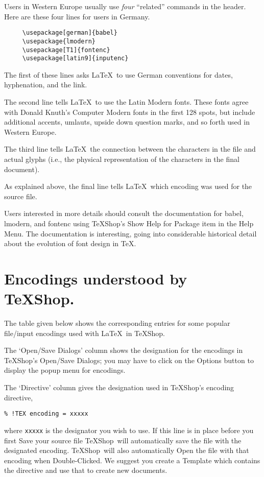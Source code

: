 \documentclass[letterpaper,11pt]{article}
\newcommand{\TS}{\textsf{\TeX Shop}}
\newcommand{\cmd}[1]{\textsf{#1}}
\begin{document}
Users in Western Europe usually use \emph{four} ``related'' commands in the header.
Here are these four lines for users in Germany.
\begin{verbatim}
     \usepackage[german]{babel}
     \usepackage{lmodern}
     \usepackage[T1]{fontenc}
     \usepackage[latin9]{inputenc}
\end{verbatim}

The first of these lines asks \LaTeX\ to use German conventions for dates, hyphenation, and the link. 

The second line tells \LaTeX\ to use the Latin Modern fonts. These fonts agree with Donald Knuth's Computer Modern fonts in the first 128 spots, but include additional accents, umlauts, upside down question marks, and so forth used in Western Europe.

The third line tells \LaTeX\ the connection between the characters in the file and actual glyphs (i.e., the physical representation of the characters in the final document).

As explained above, the final line tells \LaTeX\ which encoding was used for the source file.

Users interested in more details should consult the documentation for \cmd{babel}, \cmd{lmodern},
and \cmd{fontenc} using \TS's \cmd{Show Help for Package} item in the \cmd{Help} Menu. The documentation
is interesting, going into considerable historical detail about the evolution of font design in \TeX.



\section{Encodings understood by \TS.}\label{thetable}

The table given below shows the corresponding entries for some popular file/input encodings used with \LaTeX\ in \TS.

The `Open/Save Dialogs' column shows the designation for the encodings in \TS's Open/Save Dialogs; you may have to click on the \cmd{Options} button to display the popup menu for encodings. 

The `Directive' column gives the designation used in \TS's encoding directive,
\begin{verbatim}
% !TEX encoding = xxxxx
\end{verbatim}
where \texttt{xxxxx} is the designator you wish to use. If this line is in place before you first \cmd{Save} your source file \TS\ will automatically save the file with the designated encoding. \TS\ will also automatically \cmd{Open} the file with that encoding when \cmd{Double-Clicked}. We suggest you create a Template which contains the directive and use that to create new documents.
\end{document}
